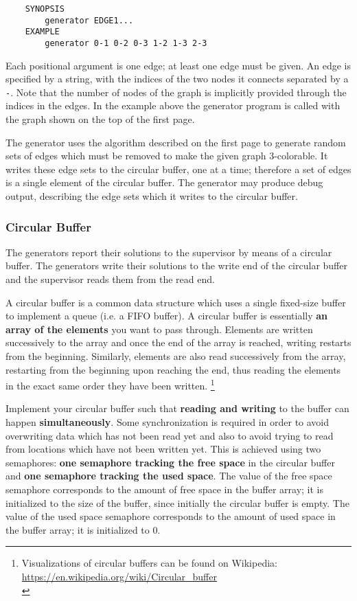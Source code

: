 \begin{verbatim}
    SYNOPSIS
        generator EDGE1...
    EXAMPLE
        generator 0-1 0-2 0-3 1-2 1-3 2-3
\end{verbatim}

Each positional argument is one edge; at least one edge must be given.
An edge is specified by a string,
with the indices of the two nodes it connects separated by a \texttt{-}.
Note that the number of nodes of the graph is implicitly provided
through the indices in the edges.
In the example above the generator program is called with the graph shown on the top of the first page.

The generator uses the algorithm described on the first page
to generate random sets of edges which must be removed to make the given graph 3-colorable.
It writes these edge sets to the circular buffer, one at a time;
therefore a set of edges is a single element of the circular buffer.
The generator may produce debug output,
describing the edge sets which it writes to the circular buffer.

\clearpage
\subsubsection*{Circular Buffer}

The generators report their solutions to the supervisor by means of a circular buffer.
The generators write their solutions to the write end of the circular buffer
and the supervisor reads them from the read end.

A circular buffer is a common data structure which uses a single fixed-size buffer
to implement a queue (i.e. a FIFO buffer).
A circular buffer is essentially \textbf{an array of the elements} you want to pass through.
Elements are written successively to the array
and once the end of the array is reached, writing restarts from the beginning.
Similarly, elements are also read successively from the array,
restarting from the beginning upon reaching the end,
thus reading the elements in the exact same order they have been written.
\footnote{
Visualizations of circular buffers can be found on Wikipedia:\\
\url{https://en.wikipedia.org/wiki/Circular_buffer}\\
}

Implement your circular buffer such that \textbf{reading and writing} to the buffer
can happen \textbf{simultaneously}.
Some synchronization is required
in order to avoid overwriting data which has not been read yet
and also to avoid trying to read from locations which have not been written yet.
This is achieved using two semaphores:
\textbf{one semaphore tracking the free space} in the circular buffer
and \textbf{one semaphore tracking the used space}.
The value of the free space semaphore corresponds to the amount of free space in the buffer array;
it is initialized to the size of the buffer, since initially the circular buffer is empty.
The value of the used space semaphore corresponds to the amount of used space in the buffer array;
it is initialized to 0.

